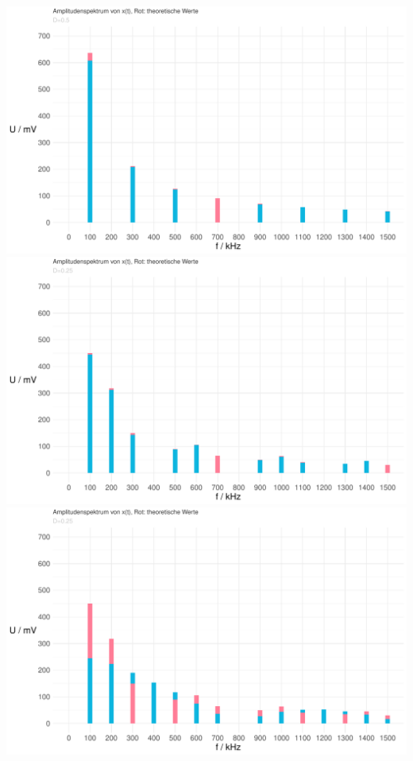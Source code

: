 \documentclass[a4paper, 12pt]{article}
\begin{document}
    \begin{center}
      \includegraphics[scale=0.5]{./R/3_1/3_1_ASpektrum.pdf}
      \vspace{0.021276873\paperheight}
      \vspace{0.021276873\paperheight}
      \includegraphics[scale=0.5]{./R/3_1/3_1_ASpektrum_025.pdf}
      \vspace{0.021276873\paperheight}
      \vspace{0.021276873\paperheight}
      \includegraphics[scale=0.5]{./R/3_1/3_1_ASpektrum_0125.pdf}
    \end{center}
\end{document}
